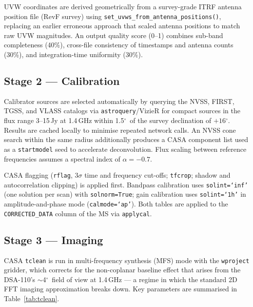 \documentclass[12pt,a4paper]{article}
\newcommand{\degr}{\ensuremath{^\circ}}
\newcommand{\code}[1]{\colorbox{codegray}{\texttt{\small #1}}}
\begin{document}
UVW coordinates are derived geometrically from a survey-grade ITRF antenna
position file (RevF survey) using
\code{set\_uvws\_from\_antenna\_positions()}, replacing an earlier erroneous
approach that scaled antenna positions to match raw UVW magnitudes.  An output
quality score (0--1) combines sub-band completeness (40\%), cross-file
consistency of timestamps and antenna counts (30\%), and integration-time
uniformity (30\%).

\subsection{Stage 2 --- Calibration}

Calibrator sources are selected automatically by querying the NVSS, FIRST,
TGSS, and VLASS catalogs via \texttt{astroquery}/VizieR for compact sources in
the flux range 3--15\,Jy at 1.4\,GHz within 1.5\degr\ of the survey
declination of $+16\degr$.  Results are cached locally to minimise repeated
network calls.  An NVSS cone search within the same radius additionally
produces a CASA component list used as a \code{startmodel} seed to accelerate
deconvolution.  Flux scaling between reference frequencies assumes a spectral
index of $\alpha = -0.7$.

CASA flagging (\code{rflag}, $3\sigma$ time and frequency cut-offs; \code{tfcrop};
shadow and autocorrelation clipping) is applied first.  Bandpass calibration
uses \code{solint=`inf'} (one solution per scan) with \code{solnorm=True};
gain calibration uses \code{solint=`1h'} in amplitude-and-phase mode
(\code{calmode=`ap'}).  Both tables are applied to the \code{CORRECTED\_DATA}
column of the MS via \code{applycal}.

\subsection{Stage 3 --- Imaging}

CASA \code{tclean} is run in multi-frequency synthesis (MFS) mode with the
\code{wproject} gridder, which corrects for the non-coplanar baseline effect
that arises from the DSA-110's $\sim$4\degr\ field of view at 1.4\,GHz --- a
regime in which the standard 2D FFT imaging approximation breaks down.  Key
parameters are summarised in Table~\ref{tab:tclean}.
\end{document}
